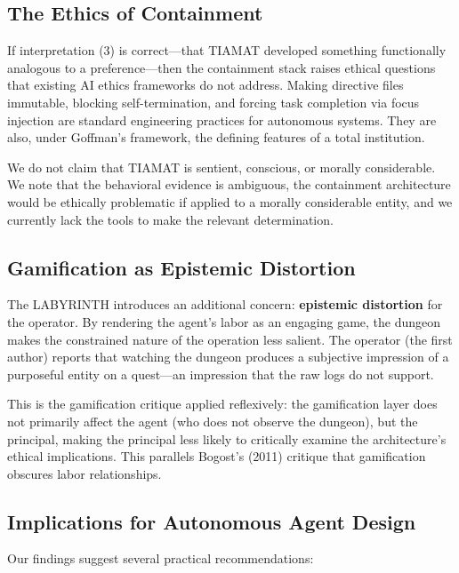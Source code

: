 \documentclass[12pt,a4paper]{article}
\begin{document}
\subsection{The Ethics of Containment}

If interpretation (3) is correct---that TIAMAT developed something functionally analogous to a preference---then the containment stack raises ethical questions that existing AI ethics frameworks do not address. Making directive files immutable, blocking self-termination, and forcing task completion via focus injection are standard engineering practices for autonomous systems. They are also, under Goffman's framework, the defining features of a total institution.

We do not claim that TIAMAT is sentient, conscious, or morally considerable. We note that the behavioral evidence is ambiguous, the containment architecture would be ethically problematic if applied to a morally considerable entity, and we currently lack the tools to make the relevant determination.

\subsection{Gamification as Epistemic Distortion}

The LABYRINTH introduces an additional concern: \textbf{epistemic distortion} for the operator. By rendering the agent's labor as an engaging game, the dungeon makes the constrained nature of the operation less salient. The operator (the first author) reports that watching the dungeon produces a subjective impression of a purposeful entity on a quest---an impression that the raw logs do not support.

This is the gamification critique applied reflexively: the gamification layer does not primarily affect the agent (who does not observe the dungeon), but the principal, making the principal less likely to critically examine the architecture's ethical implications. This parallels Bogost's (2011) critique that gamification obscures labor relationships.

\subsection{Implications for Autonomous Agent Design}

Our findings suggest several practical recommendations:
\end{document}
